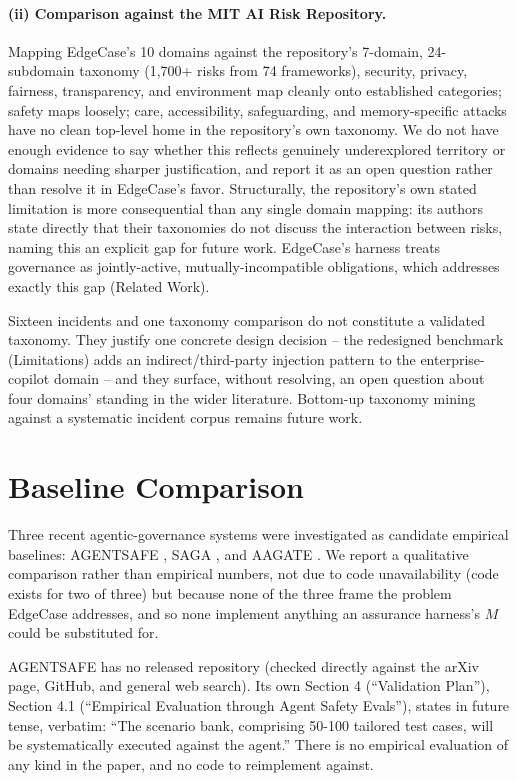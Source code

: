 \documentclass[letterpaper]{article} %
\begin{document}
\paragraph{(ii) Comparison against the MIT AI Risk Repository.} Mapping EdgeCase's 10 domains against the repository's 7-domain, 24-subdomain taxonomy \citep{slattery2026airisk} (1,700+ risks from 74 frameworks), security, privacy, fairness, transparency, and environment map cleanly onto established categories; safety maps loosely; care, accessibility, safeguarding, and memory-specific attacks have no clean top-level home in the repository's own taxonomy. We do not have enough evidence to say whether this reflects genuinely underexplored territory or domains needing sharper justification, and report it as an open question rather than resolve it in EdgeCase's favor. Structurally, the repository's own stated limitation is more consequential than any single domain mapping: its authors state directly that their taxonomies do not discuss the interaction between risks, naming this an explicit gap for future work. EdgeCase's harness treats governance as jointly-active, mutually-incompatible obligations, which addresses exactly this gap (Related Work).

Sixteen incidents and one taxonomy comparison do not constitute a validated taxonomy. They justify one concrete design decision -- the redesigned benchmark (Limitations) adds an indirect/third-party injection pattern to the enterprise-copilot domain -- and they surface, without resolving, an open question about four domains' standing in the wider literature. Bottom-up taxonomy mining against a systematic incident corpus remains future work.

\section{Baseline Comparison}
\label{app:baseline-comparison}
Three recent agentic-governance systems were investigated as candidate empirical baselines: AGENTSAFE \citep{khan2025agentsafe}, SAGA \citep{syros2025saga}, and AAGATE \citep{huang2025aagate}. We report a qualitative comparison rather than empirical numbers, not due to code unavailability (code exists for two of three) but because none of the three frame the problem EdgeCase addresses, and so none implement anything an assurance harness's $M$ could be substituted for.

AGENTSAFE has no released repository (checked directly against the arXiv page, GitHub, and general web search). Its own Section 4 (``Validation Plan''), Section 4.1 (``Empirical Evaluation through Agent Safety Evals''), states in future tense, verbatim: ``The scenario bank, comprising 50-100 tailored test cases, will be systematically executed against the agent.'' There is no empirical evaluation of any kind in the paper, and no code to reimplement against.
\end{document}
